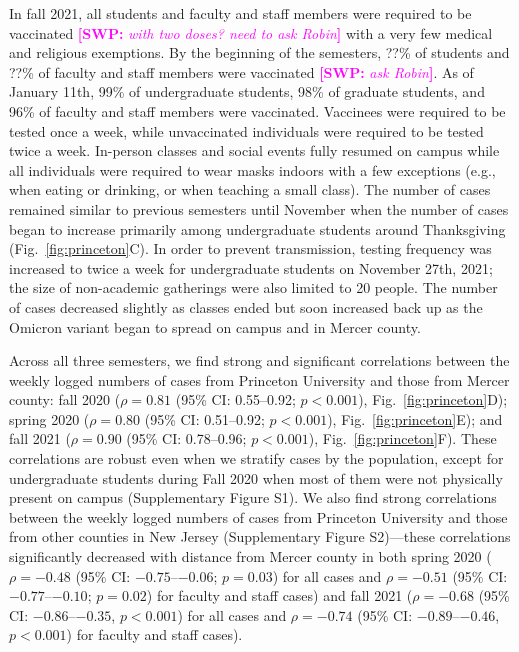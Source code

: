 \documentclass[12pt]{article}
\newcommand{\fref}[1]{Fig.~\ref{fig:#1}}
\newcommand{\comment}[3]{\textcolor{#1}{\textbf{[#2: }\textsl{#3}\textbf{]}}}
\newcommand{\swp}[1]{\comment{magenta}{SWP}{#1}}
\begin{document}
In fall 2021, all students and faculty and staff members were required to be vaccinated \swp{with two doses? need to ask Robin} with a very few medical and religious exemptions.
By the beginning of the semesters, ??\% of students and ??\% of faculty and staff members were vaccinated \swp{ask Robin}.
As of January 11th, 99\% of undergraduate students, 98\% of graduate students, and 96\% of faculty and staff members were vaccinated.
Vaccinees were required to be tested once a week, while unvaccinated individuals were required to be tested twice a week.
In-person classes and social events fully resumed on campus while all individuals were required to wear masks indoors with a few exceptions (e.g., when eating or drinking, or when teaching a small class).
The number of cases remained similar to previous semesters until November when the number of cases began to increase primarily among undergraduate students around Thanksgiving (\fref{princeton}C).  
In order to prevent transmission, testing frequency was increased to twice a week for undergraduate students on November 27th, 2021; the size of non-academic gatherings were also limited to 20 people.
The number of cases decreased slightly as classes ended but soon increased back up as the Omicron variant began to spread on campus and in Mercer county.

Across all three semesters, we find strong and significant correlations between the weekly logged numbers of cases from Princeton University and those from Mercer county:
fall 2020 ($\rho = 0.81$ (95\% CI: 0.55--0.92; $p < 0.001$), \fref{princeton}D); spring 2020 ($\rho = 0.80$ (95\% CI: 0.51--0.92; $p < 0.001$), \fref{princeton}E); and fall 2021 ($\rho = 0.90$ (95\% CI: 0.78--0.96; $p < 0.001$), \fref{princeton}F). 
These correlations are robust even when we stratify cases by the population, except for undergraduate students during Fall 2020 when most of them were not physically present on campus (Supplementary Figure S1).
We also find strong correlations between the weekly logged numbers of cases from Princeton University and those from other counties in New Jersey (Supplementary Figure S2)---these correlations significantly decreased with distance from Mercer county in both spring 2020 ($\rho=-0.48$ (95\% CI: $-0.75$--$-0.06$; $p = 0.03$) for all cases and $\rho=-0.51$ (95\% CI: $-0.77$--$-0.10$; $p = 0.02$) for faculty and staff cases) and fall 2021 ($\rho=-0.68$ (95\% CI: $-0.86$--$-0.35$, $p < 0.001$) for all cases and $\rho=-0.74$ (95\% CI: $-0.89$--$-0.46$, $p < 0.001$) for faculty and staff cases).
\end{document}
